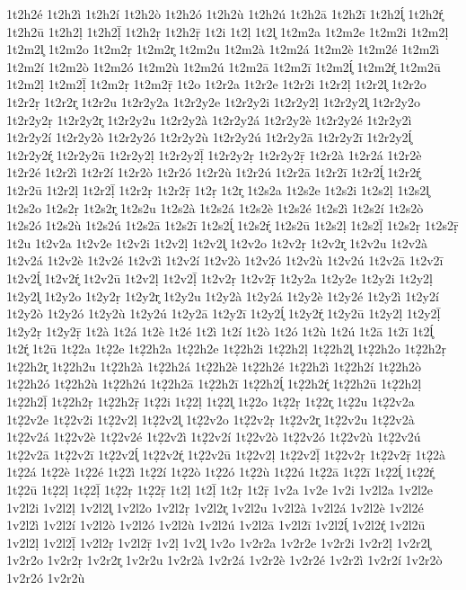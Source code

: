 {1t2h2é
1t2h2ì
1t2h2í
1t2h2ò
1t2h2ó
1t2h2ù
1t2h2ú
1t2h2ā
1t2h2ī
1t2h2ĺ̥
1t2h2ŕ̥
1t2h2ū
1t2h2ḷ
1t2h2ḹ
1t2h2ṛ
1t2h2ṝ
1t2i
1t2ḷ
1t2l̥
1t2m2a
1t2m2e
1t2m2i
1t2m2ḷ
1t2m2l̥
1t2m2o
1t2m2ṛ
1t2m2r̥
1t2m2u
1t2m2à
1t2m2á
1t2m2è
1t2m2é
1t2m2ì
1t2m2í
1t2m2ò
1t2m2ó
1t2m2ù
1t2m2ú
1t2m2ā
1t2m2ī
1t2m2ĺ̥
1t2m2ŕ̥
1t2m2ū
1t2m2ḷ
1t2m2ḹ
1t2m2ṛ
1t2m2ṝ
1t2o
1t2r2a
1t2r2e
1t2r2i
1t2r2ḷ
1t2r2l̥
1t2r2o
1t2r2ṛ
1t2r2r̥
1t2r2u
1t2r2y2a
1t2r2y2e
1t2r2y2i
1t2r2y2ḷ
1t2r2y2l̥
1t2r2y2o
1t2r2y2ṛ
1t2r2y2r̥
1t2r2y2u
1t2r2y2à
1t2r2y2á
1t2r2y2è
1t2r2y2é
1t2r2y2ì
1t2r2y2í
1t2r2y2ò
1t2r2y2ó
1t2r2y2ù
1t2r2y2ú
1t2r2y2ā
1t2r2y2ī
1t2r2y2ĺ̥
1t2r2y2ŕ̥
1t2r2y2ū
1t2r2y2ḷ
1t2r2y2ḹ
1t2r2y2ṛ
1t2r2y2ṝ
1t2r2à
1t2r2á
1t2r2è
1t2r2é
1t2r2ì
1t2r2í
1t2r2ò
1t2r2ó
1t2r2ù
1t2r2ú
1t2r2ā
1t2r2ī
1t2r2ĺ̥
1t2r2ŕ̥
1t2r2ū
1t2r2ḷ
1t2r2ḹ
1t2r2ṛ
1t2r2ṝ
1t2ṛ
1t2r̥
1t2s2a
1t2s2e
1t2s2i
1t2s2ḷ
1t2s2l̥
1t2s2o
1t2s2ṛ
1t2s2r̥
1t2s2u
1t2s2à
1t2s2á
1t2s2è
1t2s2é
1t2s2ì
1t2s2í
1t2s2ò
1t2s2ó
1t2s2ù
1t2s2ú
1t2s2ā
1t2s2ī
1t2s2ĺ̥
1t2s2ŕ̥
1t2s2ū
1t2s2ḷ
1t2s2ḹ
1t2s2ṛ
1t2s2ṝ
1t2u
1t2v2a
1t2v2e
1t2v2i
1t2v2ḷ
1t2v2l̥
1t2v2o
1t2v2ṛ
1t2v2r̥
1t2v2u
1t2v2à
1t2v2á
1t2v2è
1t2v2é
1t2v2ì
1t2v2í
1t2v2ò
1t2v2ó
1t2v2ù
1t2v2ú
1t2v2ā
1t2v2ī
1t2v2ĺ̥
1t2v2ŕ̥
1t2v2ū
1t2v2ḷ
1t2v2ḹ
1t2v2ṛ
1t2v2ṝ
1t2y2a
1t2y2e
1t2y2i
1t2y2ḷ
1t2y2l̥
1t2y2o
1t2y2ṛ
1t2y2r̥
1t2y2u
1t2y2à
1t2y2á
1t2y2è
1t2y2é
1t2y2ì
1t2y2í
1t2y2ò
1t2y2ó
1t2y2ù
1t2y2ú
1t2y2ā
1t2y2ī
1t2y2ĺ̥
1t2y2ŕ̥
1t2y2ū
1t2y2ḷ
1t2y2ḹ
1t2y2ṛ
1t2y2ṝ
1t2à
1t2á
1t2è
1t2é
1t2ì
1t2í
1t2ò
1t2ó
1t2ù
1t2ú
1t2ā
1t2ī
1t2ĺ̥
1t2ŕ̥
1t2ū
1t2̣2a
1t2̣2e
1t2̣2h2a
1t2̣2h2e
1t2̣2h2i
1t2̣2h2ḷ
1t2̣2h2l̥
1t2̣2h2o
1t2̣2h2ṛ
1t2̣2h2r̥
1t2̣2h2u
1t2̣2h2à
1t2̣2h2á
1t2̣2h2è
1t2̣2h2é
1t2̣2h2ì
1t2̣2h2í
1t2̣2h2ò
1t2̣2h2ó
1t2̣2h2ù
1t2̣2h2ú
1t2̣2h2ā
1t2̣2h2ī
1t2̣2h2ĺ̥
1t2̣2h2ŕ̥
1t2̣2h2ū
1t2̣2h2ḷ
1t2̣2h2ḹ
1t2̣2h2ṛ
1t2̣2h2ṝ
1t2̣2i
1t2̣2ḷ
1t2̣2l̥
1t2̣2o
1t2̣2ṛ
1t2̣2r̥
1t2̣2u
1t2̣2v2a
1t2̣2v2e
1t2̣2v2i
1t2̣2v2ḷ
1t2̣2v2l̥
1t2̣2v2o
1t2̣2v2ṛ
1t2̣2v2r̥
1t2̣2v2u
1t2̣2v2à
1t2̣2v2á
1t2̣2v2è
1t2̣2v2é
1t2̣2v2ì
1t2̣2v2í
1t2̣2v2ò
1t2̣2v2ó
1t2̣2v2ù
1t2̣2v2ú
1t2̣2v2ā
1t2̣2v2ī
1t2̣2v2ĺ̥
1t2̣2v2ŕ̥
1t2̣2v2ū
1t2̣2v2ḷ
1t2̣2v2ḹ
1t2̣2v2ṛ
1t2̣2v2ṝ
1t2̣2à
1t2̣2á
1t2̣2è
1t2̣2é
1t2̣2ì
1t2̣2í
1t2̣2ò
1t2̣2ó
1t2̣2ù
1t2̣2ú
1t2̣2ā
1t2̣2ī
1t2̣2ĺ̥
1t2̣2ŕ̥
1t2̣2ū
1t2̣2ḷ
1t2̣2ḹ
1t2̣2ṛ
1t2̣2ṝ
1t2ḷ
1t2ḹ
1t2ṛ
1t2ṝ
1v2a
1v2e
1v2i
1v2l2a
1v2l2e
1v2l2i
1v2l2ḷ
1v2l2l̥
1v2l2o
1v2l2ṛ
1v2l2r̥
1v2l2u
1v2l2à
1v2l2á
1v2l2è
1v2l2é
1v2l2ì
1v2l2í
1v2l2ò
1v2l2ó
1v2l2ù
1v2l2ú
1v2l2ā
1v2l2ī
1v2l2ĺ̥
1v2l2ŕ̥
1v2l2ū
1v2l2ḷ
1v2l2ḹ
1v2l2ṛ
1v2l2ṝ
1v2ḷ
1v2l̥
1v2o
1v2r2a
1v2r2e
1v2r2i
1v2r2ḷ
1v2r2l̥
1v2r2o
1v2r2ṛ
1v2r2r̥
1v2r2u
1v2r2à
1v2r2á
1v2r2è
1v2r2é
1v2r2ì
1v2r2í
1v2r2ò
1v2r2ó
1v2r2ù
}
